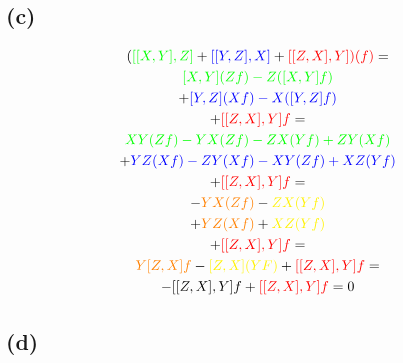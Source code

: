 \documentclass{article}
\begin{document}
\subsection*{(c)}
\begin{multline*}
	(\textcolor{green}{[[X,Y],Z]} +\textcolor{blue}{[[Y,Z],X]} +\textcolor{red}{[[Z,X],Y])(f)}=\\
	\textcolor{green}{[X,Y](Zf)-Z([X,Y]f)}\\
	+\textcolor{blue}{[Y,Z](Xf)-X([Y,Z]f)}\\
	+\textcolor{red}{[[Z,X],Y]f}=\\
\textcolor{green}{XY(Zf)-YX(Zf)-ZX(Yf)+ZY(Xf)}\\
+\textcolor{blue}{YZ(Xf)-ZY(Xf)-XY(Zf)+XZ(Yf)}\\
+\textcolor{red}{[[Z,X],Y]f}=\\
-\textcolor{orange}{YX(Zf)}-\textcolor{yellow}{ZX(Yf)}\\
+\textcolor{orange}{YZ(Xf)}+\textcolor{yellow}{XZ(Yf)}\\
+\textcolor{red}{[[Z,X],Y]f}=\\
\textcolor{orange}{Y[Z,X]f}-\textcolor{yellow}{[Z,X](YF)}+\textcolor{red}{[[Z,X],Y]f}=\\
-[[Z,X],Y]f+\textcolor{red}{[[Z,X],Y]f}=0
\end{multline*}
\subsection*{(d)}
\end{document}
